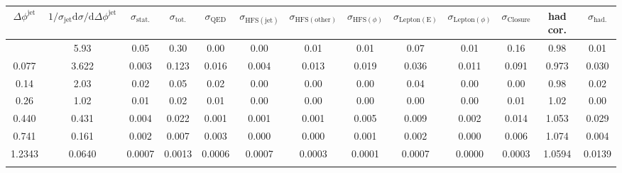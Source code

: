 \begin{table}[h!]\n\centering\n\begin{adjustbox}{width=1\textwidth}\n\begin{tabular}{| c | c | c | c || c | c | c | c | c | c | c || c | c |}\n\hline\n$\Delta\phi^\mathrm{jet}$ &$1/\sigma_\mathrm{jet}\mathrm{d}\sigma/\mathrm{d}\Delta\phi^\mathrm{jet}$ & $\sigma_\mathrm{stat.}$& $\sigma_\mathrm{tot.}$&$\sigma_\mathrm{QED}$&$\sigma_\mathrm{HFS(jet)}$&$\sigma_\mathrm{HFS(other)}$ &$\sigma_{\mathrm{HFS}(\phi)}$&$\sigma_\mathrm{Lepton(E)}$&$\sigma_{\mathrm{Lepton}(\phi)}$&$\sigma_\mathrm{Closure}$ & had cor. & $\sigma_\mathrm{had.}$\\
\hline\n0.03&5.93&0.05&0.30&0.00&0.00&0.01&0.01&0.07&0.01&0.16&0.98&0.01 \\
0.077&3.622&0.003&0.123&0.016&0.004&0.013&0.019&0.036&0.011&0.091&0.973&0.030 \\
0.14&2.03&0.02&0.05&0.02&0.00&0.00&0.00&0.04&0.00&0.00&0.98&0.02 \\
0.26&1.02&0.01&0.02&0.01&0.00&0.00&0.00&0.00&0.00&0.01&1.02&0.00 \\
0.440&0.431&0.004&0.022&0.001&0.001&0.001&0.005&0.009&0.002&0.014&1.053&0.029 \\
0.741&0.161&0.002&0.007&0.003&0.000&0.000&0.001&0.002&0.000&0.006&1.074&0.004 \\
1.2343&0.0640&0.0007&0.0013&0.0006&0.0007&0.0003&0.0001&0.0007&0.0000&0.0003&1.0594&0.0139 \\
\hline\n\end{tabular}\n\end{adjustbox}\n\end{table}\n